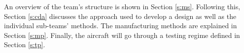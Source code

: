 An overview of the team's structure is shown in Section \ref{s:ms}. Following this, Section \ref{s:cda} discusses the approach used to develop a design as well as the individual sub-teams' methods. The manufacturing methods are explained in Section \ref{s:mp}. Finally, the aircraft will go through a testing regime defined in Section \ref{s:tp}.
%


